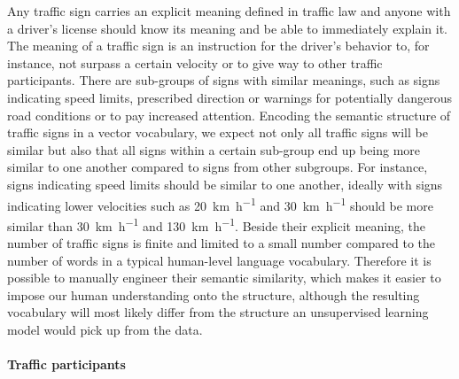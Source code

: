 Any traffic sign carries an explicit meaning defined in traffic law and anyone with a driver's license should know its meaning and be able to immediately explain it.
The meaning of a traffic sign is an instruction for the driver's behavior to, for instance, not surpass a certain velocity or to give way to other traffic participants. 
There are sub-groups of signs with similar meanings, such as signs indicating speed limits, prescribed direction or warnings for potentially dangerous road conditions or to pay increased attention.
Encoding the semantic structure of traffic signs in a vector vocabulary, we expect not only all traffic signs will be similar but also that all signs within a certain sub-group end up being more similar to one another compared to signs from other subgroups. 
For instance, signs indicating speed limits should be similar to one another, ideally with signs indicating lower velocities such as \SI[per-mode=symbol]{20}{\kilo\meter\per\hour} and \SI[per-mode=symbol]{30}{\kilo\meter\per\hour} should be more similar than \SI[per-mode=symbol]{30}{\kilo\meter\per\hour} and \SI[per-mode=symbol]{130}{\kilo\meter\per\hour}. 
Beside their explicit meaning, the number of traffic signs is finite and limited to a small number compared to the number of words in a typical human-level language vocabulary.
Therefore it is possible to manually engineer their semantic similarity, which makes it easier to impose our human understanding onto the structure, although the resulting vocabulary will most likely differ from the structure an unsupervised learning model would pick up from the data. 

\paragraph{Traffic participants}%
\label{par:traffic_participants}

